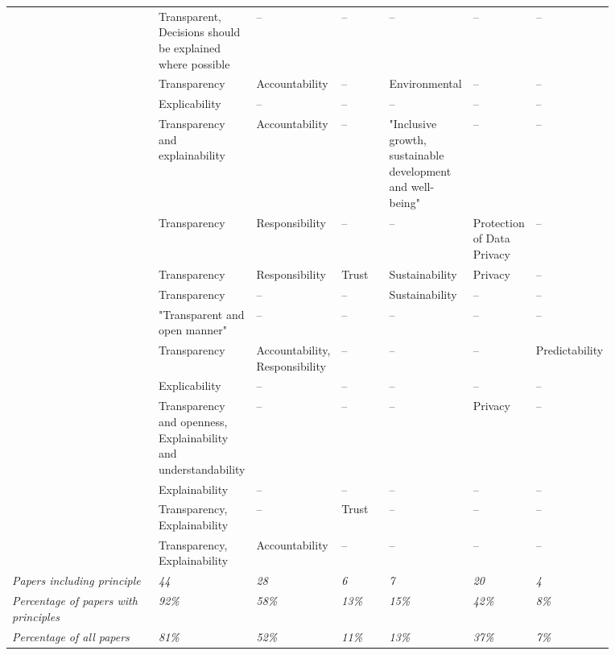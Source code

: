 \begin{landscape}
\begin{ThreePartTable}
\begin{longtable}{P{0.25\linewidth}P{0.12\linewidth}P{0.12\linewidth}P{0.08\linewidth}P{0.1\linewidth}P{0.1\linewidth}P{0.1\linewidth}}
        \textcite{Nauck_2019} & Transparent, \mbox{Decisions} should be explained where \mbox{possible} & -- & -- & -- & -- & -- \\ 
        \textcite{Papagiannidis_2022} & Transparency & Accountability & -- & Environmental & -- & -- \\ 
        \textcite{Peters_2020} & Explicability & -- & -- & -- & -- & -- \\ 
        \textcite{Rizinski_2022} & Transparency and explainability & Accountability & -- & "Inclusive growth, sustainable \mbox{development} and well-being" & -- & -- \\ 
        \textcite{Rothenberger_2019} & Transparency & Responsibility & -- & -- & Protection of Data Privacy & -- \\ 
        \textcite{Ryan_2021} & Transparency & Responsibility & Trust & Sustainability & Privacy & -- \\ 
        \textcite{Siala_2022} & Transparency & -- & -- & Sustainability & -- & -- \\ 
        \textcite{Thelisson_2018} & "Transparent and open manner" & -- & -- & -- & -- & -- \\ 
        \textcite{Vakkuri_2022} & Transparency & Accountability, \mbox{Responsibility} & -- & -- & -- & Predictability \\ 
        \textcite{vanBruxvoort_2021} & Explicability & -- & -- & -- & -- & -- \\ 
        \textcite{Vetro_2019} & Transparency and openness, \mbox{Explainability} and understandability & -- & -- & -- & Privacy & -- \\  
        \textcite{WangW_2021} & Explainability & -- & -- & -- & -- & -- \\ 
        \textcite{WangY_2020} & Transparency, \mbox{Explainability} & -- & Trust & -- & -- & -- \\
        \textcite{Werder_2022} & Transparency, \mbox{Explainability} & Accountability & -- & -- & -- & -- \\ 

    \midrule
        \textit{Papers including principle} & \textit{44} & \textit{28} & \textit{6} & \textit{7} & \textit{20} & \textit{4} \\ 
        \textit{Percentage of papers with principles} & \textit{92\%} & \textit{58\%} & \textit{13\%} & \textit{15\%} & \textit{42\%} & \textit{8\%} \\ 
        \textit{Percentage of all papers} & \textit{81\%} & \textit{52\%} & \textit{11\%} & \textit{13\%} & \textit{37\%} & \textit{7\%} \\  
\end{longtable}


\end{ThreePartTable}
\end{landscape}
